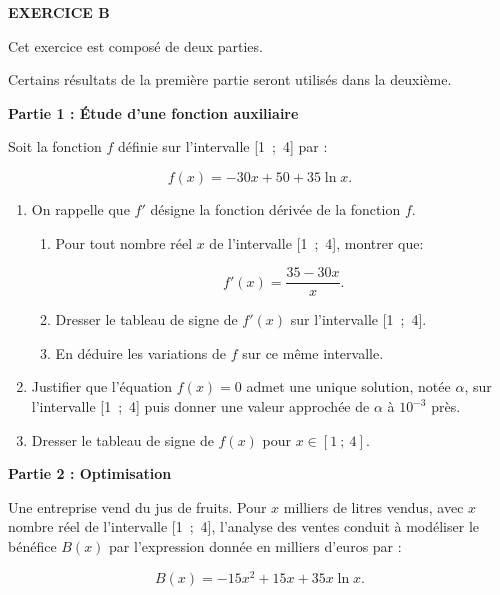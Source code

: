 \textbf{EXERCICE B}

\medskip


\medskip

Cet exercice est composé de deux parties.

\medskip

Certains résultats de la première partie seront utilisés dans la deuxième.

\medskip

\begin{center}\textbf{Partie 1 : Étude d'une fonction auxiliaire}\end{center}

Soit la fonction $f$ définie sur l'intervalle [1~;~4] par : 

\[f(x) = - 30x + 50 + 35\ln x.\]

\begin{enumerate}
\item On rappelle que $f'$ désigne la fonction dérivée de la fonction $f$.
	\begin{enumerate}
		\item Pour tout nombre réel $x$ de l'intervalle [1~;~4], montrer que: 
		
\[f'(x) = \dfrac{35- 30x}{x}.\]

		\item Dresser le tableau de signe de $f'(x)$ sur l'intervalle [1~;~4].
		\item En déduire les variations de $f$ sur ce même intervalle.
	\end{enumerate}
\item Justifier que l'équation $f(x) = 0$ admet une unique solution, notée $\alpha$, sur l'intervalle [1~;~4] puis donner une valeur approchée de $\alpha$ à $10^{-3}$ près.
\item  Dresser le tableau de signe de $f(x)$ pour $x \in [1~;~4]$.
\end{enumerate}

\bigskip

\textbf{Partie 2 : Optimisation}

\medskip

Une entreprise vend du jus de fruits. Pour $x$ milliers de litres vendus, avec $x$ nombre réel de l'intervalle [1~;~4], l'analyse des ventes conduit à modéliser le bénéfice $B(x)$ par l'expression donnée en milliers d'euros par :

\[B(x) = - 15x^2 + 15x +35x \ln x.\]

